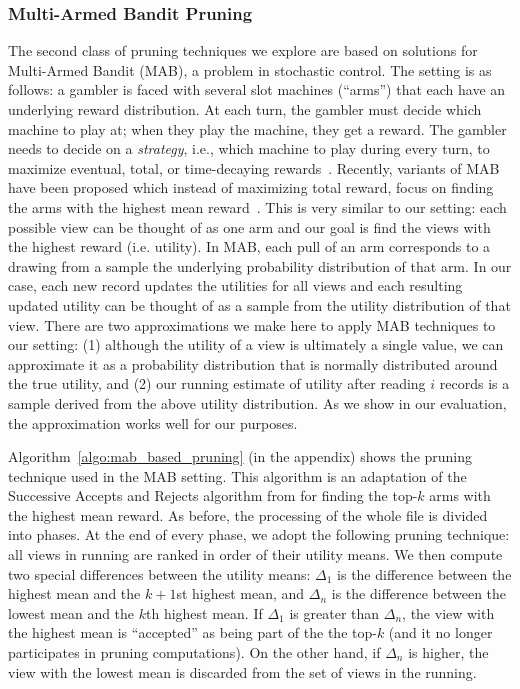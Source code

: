 \subsubsection{Multi-Armed Bandit Pruning}
\label{sec:multi_armed_bandit}
The second class of pruning techniques we explore
are based on solutions for Multi-Armed Bandit (MAB), a problem 
in stochastic control. 
The setting is as follows: 
a gambler is faced with several slot
machines (``arms'') that each have an underlying reward
distribution. 
At each turn, the gambler must decide which machine
to play at; when they play the machine, they get a reward.
The gambler needs to decide on a {\em strategy}, i.e.,
which machine to play during every turn, to maximize
eventual, total, or time-decaying rewards~\cite{bandits}.
Recently, variants of MAB have been proposed 
which instead of maximizing total reward, 
focus on finding the arms with the highest mean reward~\cite{BubeckWV13}.
This is very similar to our setting: each possible view can be thought of as
one arm and our goal is find the views with the highest reward (i.e.
utility).
In MAB, each pull of an arm corresponds to a drawing from a sample
the underlying probability distribution of that arm.
In our case, each new record updates the utilities for all views and
each resulting updated utility can be thought of as a sample from the
utility distribution of that view.
There are two approximations we make here to apply MAB techniques
to our setting: 
(1) although the utility of a
view is ultimately a single value, we can approximate it as a probability
distribution that is normally distributed around the true utility, and 
(2) our running estimate of utility after reading $i$
records is a sample derived from the above utility distribution.
As we show in our evaluation, the approximation works well
for our purposes.

Algorithm~\ref{algo:mab_based_pruning} (in the appendix) shows the pruning technique used in the
MAB setting.
This algorithm is an adaptation of the Successive Accepts and Rejects
algorithm from \cite{BubeckWV13} for finding the top-$k$ arms with the highest
mean reward.
As before, the processing of the whole file is divided into phases.
At the end of every phase, we adopt the following pruning technique: all views
in running are ranked in order of their utility means. 
We then compute two special differences between the utility means: $\Delta_1$
is the difference between the highest mean and the $k+1$st highest mean, and
$\Delta_n$ is the difference between the lowest mean and the $k$th highest mean.
If $\Delta_1$ is greater than $\Delta_n$, the view with the highest mean is
``accepted'' as being part of the the top-$k$ (and it no longer participates
in pruning computations).
On the other hand, if $\Delta_n$ is higher, the view with the lowest mean is discarded
from the set of views in the running.




